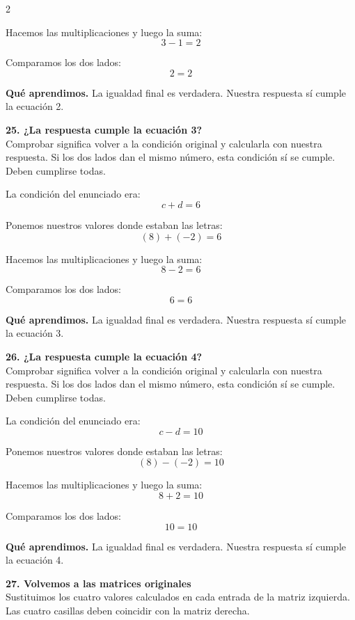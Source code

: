 \documentclass[11pt,a4paper,landscape]{article}
\begin{document}
\begin{multicols*}{2}
\begin{minipage}{\linewidth}
\par\smallskip Hacemos las multiplicaciones y luego la suma:
\[3 - 1=2\]
\par\smallskip Comparamos los dos lados:
\[2=2\]
\par\smallskip\textbf{Qué aprendimos.} La igualdad final es verdadera. Nuestra respuesta sí cumple la ecuación 2.
\end{minipage}\par\medskip
\noindent\begin{minipage}{\linewidth}\textbf{25. ¿La respuesta cumple la ecuación 3?}\\[2pt]Comprobar significa volver a la condición original y calcularla con nuestra respuesta. Si los dos lados dan el mismo número, esta condición sí se cumple. Deben cumplirse todas.
\par\smallskip La condición del enunciado era:
\[c + d = 6\]
\par\smallskip Ponemos nuestros valores donde estaban las letras:
\[\left(8\right) + \left(-2\right)=6\]
\par\smallskip Hacemos las multiplicaciones y luego la suma:
\[8 - 2=6\]
\par\smallskip Comparamos los dos lados:
\[6=6\]
\par\smallskip\textbf{Qué aprendimos.} La igualdad final es verdadera. Nuestra respuesta sí cumple la ecuación 3.
\end{minipage}\par\medskip
\noindent\begin{minipage}{\linewidth}\textbf{26. ¿La respuesta cumple la ecuación 4?}\\[2pt]Comprobar significa volver a la condición original y calcularla con nuestra respuesta. Si los dos lados dan el mismo número, esta condición sí se cumple. Deben cumplirse todas.
\par\smallskip La condición del enunciado era:
\[c - d = 10\]
\par\smallskip Ponemos nuestros valores donde estaban las letras:
\[\left(8\right) - \left(-2\right)=10\]
\par\smallskip Hacemos las multiplicaciones y luego la suma:
\[8 + 2=10\]
\par\smallskip Comparamos los dos lados:
\[10=10\]
\par\smallskip\textbf{Qué aprendimos.} La igualdad final es verdadera. Nuestra respuesta sí cumple la ecuación 4.
\end{minipage}\par\medskip
\noindent\begin{minipage}{\linewidth}\textbf{27. Volvemos a las matrices originales}\\[2pt]Sustituimos los cuatro valores calculados en cada entrada de la matriz izquierda. Las cuatro casillas deben coincidir con la matriz derecha.

\end{minipage}
\end{multicols*}
\end{document}
